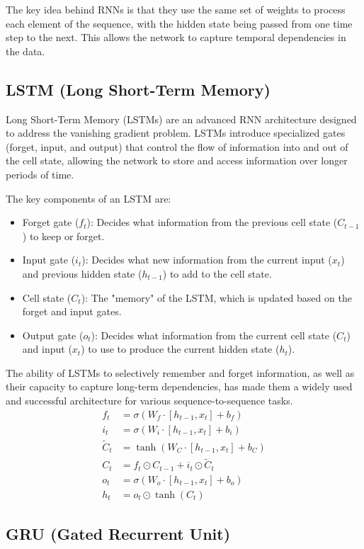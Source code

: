 \documentclass{ieeeojies}
\begin{document}
The key idea behind RNNs is that they use the same set of weights to process each element of the sequence, with the hidden state being passed from one time step to the next. This allows the network to capture temporal dependencies in the data.

\subsection{LSTM (Long Short-Term Memory)}
Long Short-Term Memory (LSTMs) are an advanced RNN architecture designed to address the vanishing gradient problem. LSTMs introduce specialized gates (forget, input, and output) that control the flow of information into and out of the cell state, allowing the network to store and access information over longer periods of time.

The key components of an LSTM are:
\begin{itemize}
	\item Forget gate ($f_t$): Decides what information from the previous cell state ($C_{t-1}$) to keep or forget.
	\item Input gate ($i_t$): Decides what new information from the current input ($x_t$) and previous hidden state ($h_{t-1}$) to add to the cell state.
	\item Cell state ($C_t$): The "memory" of the LSTM, which is updated based on the forget and input gates.
	\item Output gate ($o_t$): Decides what information from the current cell state ($C_t$) and input ($x_t$) to use to produce the current hidden state ($h_t$).
\end{itemize}

The ability of LSTMs to selectively remember and forget information, as well as their capacity to capture long-term dependencies, has made them a widely used and successful architecture for various sequence-to-sequence tasks.
$$
\begin{aligned}
	f_t &= \sigma(W_f \cdot [h_{t-1}, x_t] + b_f) \\
	i_t &= \sigma(W_i \cdot [h_{t-1}, x_t] + b_i) \\
	\tilde{C}_t &= \tanh(W_C \cdot [h_{t-1}, x_t] + b_C) \\
	C_t &= f_t \odot C_{t-1} + i_t \odot \tilde{C}_t \\
	o_t &= \sigma(W_o \cdot [h_{t-1}, x_t] + b_o) \\
	h_t &= o_t \odot \tanh(C_t)
\end{aligned}
$$
\subsection{GRU (Gated Recurrent Unit)}
\end{document}
